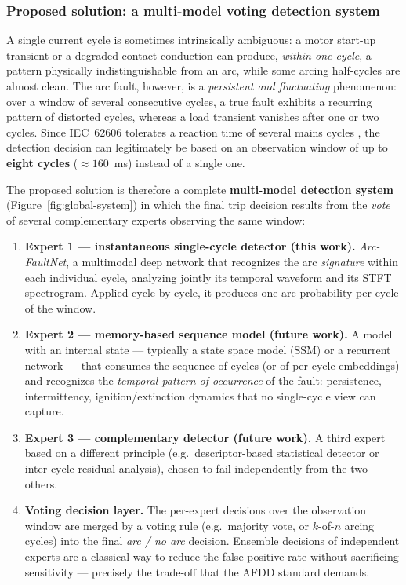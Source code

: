 \subsubsection{Proposed solution: a multi-model voting detection system}
\label{sec:global-system}

A single current cycle is sometimes intrinsically ambiguous: a motor start-up transient or a degraded-contact conduction can produce, \emph{within one cycle}, a pattern physically indistinguishable from an arc, while some arcing half-cycles are almost clean. The arc fault, however, is a \emph{persistent and fluctuating} phenomenon: over a window of several consecutive cycles, a true fault exhibits a recurring pattern of distorted cycles, whereas a load transient vanishes after one or two cycles. Since IEC~62606 tolerates a reaction time of several mains cycles \cite{iec62606}, the detection decision can legitimately be based on an observation window of up to \textbf{eight cycles} ($\approx 160$~ms) instead of a single one.

\medskip

The proposed solution is therefore a complete \textbf{multi-model detection system} (Figure~\ref{fig:global-system}) in which the final trip decision results from the \emph{vote} of several complementary experts observing the same window:

\begin{enumerate}[itemsep=2pt]
    \item \textbf{Expert 1 --- instantaneous single-cycle detector (this work).} \emph{Arc-FaultNet}, a multimodal deep network that recognizes the arc \emph{signature} within each individual cycle, analyzing jointly its temporal waveform and its STFT spectrogram. Applied cycle by cycle, it produces one arc-probability per cycle of the window.
    \item \textbf{Expert 2 --- memory-based sequence model (future work).} A model with an internal state --- typically a state space model (SSM) or a recurrent network --- that consumes the sequence of cycles (or of per-cycle embeddings) and recognizes the \emph{temporal pattern of occurrence} of the fault: persistence, intermittency, ignition/extinction dynamics that no single-cycle view can capture.
    \item \textbf{Expert 3 --- complementary detector (future work).} A third expert based on a different principle (e.g.\ descriptor-based statistical detector or inter-cycle residual analysis), chosen to fail independently from the two others.
    \item \textbf{Voting decision layer.} The per-expert decisions over the observation window are merged by a voting rule (e.g.\ majority vote, or $k$-of-$n$ arcing cycles) into the final \emph{arc / no arc} decision. Ensemble decisions of independent experts are a classical way to reduce the false positive rate without sacrificing sensitivity --- precisely the trade-off that the AFDD standard demands.
\end{enumerate}

